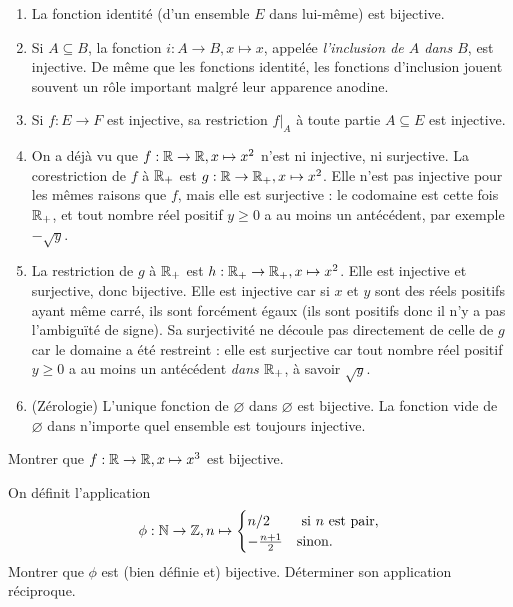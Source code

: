 \begin{exemple}
\begin{enumerate}
\item La fonction identité (d'un ensemble $E$ dans lui-même) est bijective.
\item Si $A\subseteq B$, la fonction $i : A\to B, x\mapsto x$, appelée \emph{l'inclusion de $A$ dans $B$}, est injective. De même que les fonctions identité, les fonctions d'inclusion jouent souvent un rôle important malgré leur apparence anodine.
\item Si $f : E\to F$ est injective, sa restriction $f|_A$ à toute partie $A\subseteq E$ est injective.
\item On a déjà vu que $f : \mathbb{R} \to \mathbb{R}, x\mapsto x^2$ n'est ni injective, ni surjective. La corestriction de $f$ à $\mathbb{R}_+$ est $g : \mathbb{R} \to \mathbb{R}_+, x\mapsto x^2$. Elle n'est pas injective pour les mêmes raisons que $f$, mais elle est surjective : le codomaine est cette fois $\mathbb{R}_+$, et tout nombre réel positif $y\geq 0$ a au moins un antécédent, par exemple $-\sqrt{y}$.
\item La restriction de $g$ à $\mathbb{R}_+$ est $h : \mathbb{R}_+ \to \mathbb{R}_+, x\mapsto x^2$. Elle est injective et surjective, donc bijective. Elle est injective car si $x$ et $y$ sont des réels positifs ayant même carré, ils sont forcément égaux (ils sont positifs donc il n'y a pas l'ambiguïté de signe). Sa surjectivité ne découle pas directement de celle de $g$ car le domaine a été restreint : elle est surjective car tout nombre réel positif $y\geq 0$ a au moins un antécédent \emph{dans $\mathbb{R}_+$}, à savoir $\sqrt{y}$.
\item (Zérologie) L'unique fonction de $\varnothing$ dans $\varnothing$ est bijective. La fonction vide de $\varnothing$ dans n'importe quel ensemble est toujours injective.
\end{enumerate}
\end{exemple}

\begin{exercice}
Montrer que  $f: \mathbb{R}\to \mathbb{R}, x\mapsto x^3$ est bijective.
\end{exercice}

\begin{exercice}
On définit l'application 
\[\phi : \mathbb{N}\to \mathbb{Z}, n\mapsto \begin{cases} n/2&\text{ si $n$ est pair},\\ -\frac{n+1}{2} & \text{sinon.}\end{cases}
\]
Montrer que $\phi$ est (bien définie et) bijective. Déterminer son application réciproque.
\end{exercice}

